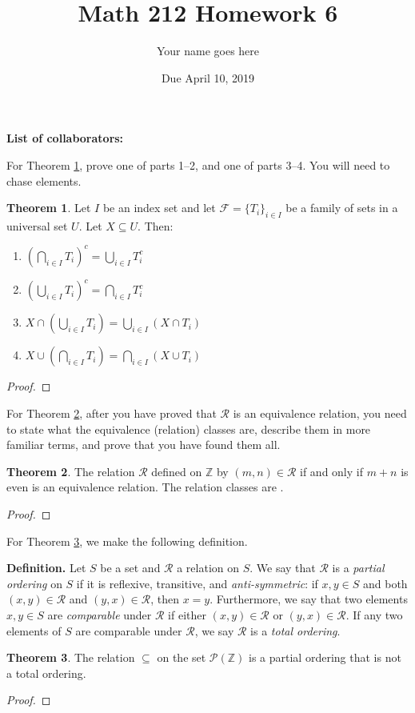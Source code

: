 \documentclass[11pt]{article}		%
\title{Math 212 Homework 6}
\author{Your name goes here}
\date{Due April 10, 2019}
\def\Z{{\mathbb Z}}
\theoremstyle{definition}
\newtheorem{theorem}{Theorem}
\begin{document}
\maketitle

\noindent\textbf{List of collaborators:}

\noindent For Theorem \ref{thm:indexsets}, prove one of parts 1--2, and one of parts 3--4.
You will need to chase elements.

\begin{theorem}\label{thm:indexsets}
	Let $I$ be an index set and let $\mathcal{F} = \{T_i\}_{i\in I}$ be a family of sets in a universal set $U$.
	Let $X\subseteq U$.
	Then:
		\begin{enumerate}
			\item $\left(\bigcap\limits_{i\in I} T_i\right)^c = \bigcup\limits_{i\in I} T_i^c$
			\item $\left(\bigcup\limits_{i\in I} T_i\right)^c = \bigcap\limits_{i\in I} T_i^c$
			\item $X \cap \left(\bigcup\limits_{i\in I} T_i\right) = \bigcup\limits_{i\in I} (X\cap T_i)$
			\item $X \cup \left(\bigcap\limits_{i\in I} T_i\right) = \bigcap\limits_{i\in I} (X\cup T_i)$
		\end{enumerate}
\end{theorem}

\begin{proof}

\end{proof}

\noindent For Theorem \ref{thm:relations}, after you have proved that $\mathcal{R}$ is an equivalence relation, you need to state what the equivalence (relation) classes are, describe them in more familiar terms, and prove that you have found them all.

\begin{theorem}\label{thm:relations}
	The relation $\mathcal{R}$ defined on $\Z$ by $(m,n)\in \mathcal{R}$ if and only if $m+n$ is even is an equivalence relation.
	The relation classes are \makebox[0.75in]{\hrulefill}.
\end{theorem}

\begin{proof} 

\end{proof}


\noindent For Theorem \ref{thm:partialorder}, we make the following definition.

\noindent\textbf{Definition. } Let $S$ be a set and $\mathcal{R}$ a relation on $S$.
We say that $\mathcal{R}$ is a \emph{partial ordering} on $S$ if it is reflexive, transitive, and \emph{anti-symmetric}: if $x,y\in S$ and both $(x,y)\in \mathcal{R}$ and $(y,x)\in \mathcal{R}$, then $x = y$.
Furthermore, we say that two elements $x,y\in S$ are \emph{comparable} under $\mathcal{R}$ if either $(x,y)\in \mathcal{R}$ or $(y,x)\in\mathcal{R}$.
If any two elements of $S$ are comparable under $\mathcal{R}$, we say $\mathcal{R}$ is a \emph{total ordering}.

\begin{theorem}\label{thm:partialorder}
	The relation $\subseteq$ on the set $\mathcal{P}(\Z)$ is a partial ordering that is not a total ordering.
\end{theorem}

\begin{proof}

\end{proof}
\end{document}
